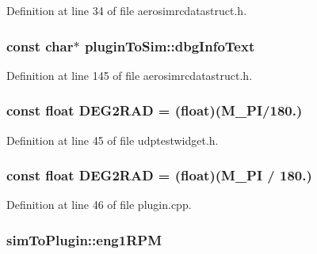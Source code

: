 Definition at line 34 of file aerosimrcdatastruct.\-h.

\hypertarget{group___aero_sim_r_c_ga8d1dec1f6592d85b15941b3ce658f44a}{
\subsubsection[{dbg\-Info\-Text}]{\setlength{\rightskip}{0pt plus 5cm}const char$\ast$ plugin\-To\-Sim\-::dbg\-Info\-Text}}\label{group___aero_sim_r_c_ga8d1dec1f6592d85b15941b3ce658f44a}


Definition at line 145 of file aerosimrcdatastruct.\-h.

\hypertarget{group___aero_sim_r_c_gacbfd2fc3314cc3762ea0c3720979f8bc}{
\subsubsection[{D\-E\-G2\-R\-A\-D}]{\setlength{\rightskip}{0pt plus 5cm}const {\bf float} D\-E\-G2\-R\-A\-D = ({\bf float})(M\-\_\-\-P\-I/180.)}}\label{group___aero_sim_r_c_gacbfd2fc3314cc3762ea0c3720979f8bc}


Definition at line 45 of file udptestwidget.\-h.

\hypertarget{group___aero_sim_r_c_gacbfd2fc3314cc3762ea0c3720979f8bc}{
\subsubsection[{D\-E\-G2\-R\-A\-D}]{\setlength{\rightskip}{0pt plus 5cm}const {\bf float} D\-E\-G2\-R\-A\-D = ({\bf float})(M\-\_\-\-P\-I / 180.)}}\label{group___aero_sim_r_c_gacbfd2fc3314cc3762ea0c3720979f8bc}


Definition at line 46 of file plugin.\-cpp.

\hypertarget{group___aero_sim_r_c_ga92a2016c6887c978c9179cf3bf117c5a}{
\subsubsection[{eng1\-R\-P\-M}]{ sim\-To\-Plugin\-::eng1\-R\-P\-M}}\label{group___aero_sim_r_c_ga92a2016c6887c978c9179cf3bf117c5a}


